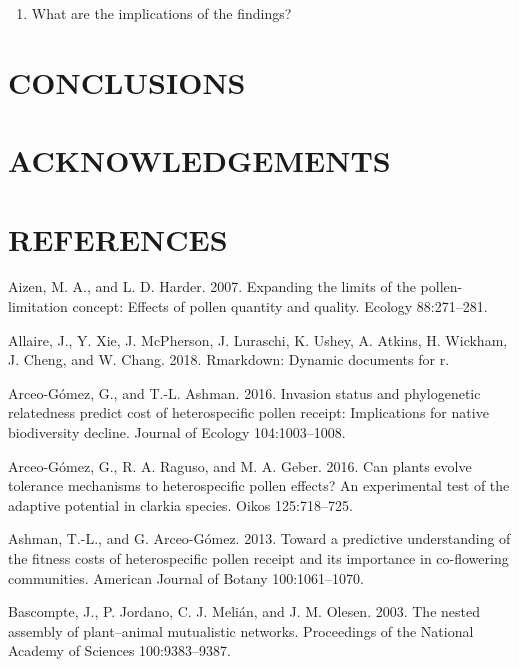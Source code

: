 \documentclass[11pt,a4paper]{article}
\providecommand{\tightlist}{%
  \setlength{\itemsep}{0pt}\setlength{\parskip}{0pt}}
\begin{document}
\begin{enumerate}
\def\labelenumi{\arabic{enumi}.}
\tightlist
\item
  What are the implications of the findings?
\end{enumerate}

\section{CONCLUSIONS}\label{conclusions}

\section{ACKNOWLEDGEMENTS}\label{acknowledgements}

\section{REFERENCES}\label{references}

\hypertarget{refs}{}
\hypertarget{ref-aizen2007}{}
Aizen, M. A., and L. D. Harder. 2007. Expanding the limits of the
pollen-limitation concept: Effects of pollen quantity and quality.
Ecology 88:271--281.

\hypertarget{ref-Allaire_2018}{}
Allaire, J., Y. Xie, J. McPherson, J. Luraschi, K. Ushey, A. Atkins, H.
Wickham, J. Cheng, and W. Chang. 2018. Rmarkdown: Dynamic documents for
r.

\hypertarget{ref-arceo2016}{}
Arceo-Gómez, G., and T.-L. Ashman. 2016. Invasion status and
phylogenetic relatedness predict cost of heterospecific pollen receipt:
Implications for native biodiversity decline. Journal of Ecology
104:1003--1008.

\hypertarget{ref-arceo2016can}{}
Arceo-Gómez, G., R. A. Raguso, and M. A. Geber. 2016. Can plants evolve
tolerance mechanisms to heterospecific pollen effects? An experimental
test of the adaptive potential in clarkia species. Oikos 125:718--725.

\hypertarget{ref-ashman2013}{}
Ashman, T.-L., and G. Arceo-Gómez. 2013. Toward a predictive
understanding of the fitness costs of heterospecific pollen receipt and
its importance in co-flowering communities. American Journal of Botany
100:1061--1070.

\hypertarget{ref-bascompte2003}{}
Bascompte, J., P. Jordano, C. J. Melián, and J. M. Olesen. 2003. The
nested assembly of plant--animal mutualistic networks. Proceedings of
the National Academy of Sciences 100:9383--9387.
\end{document}
